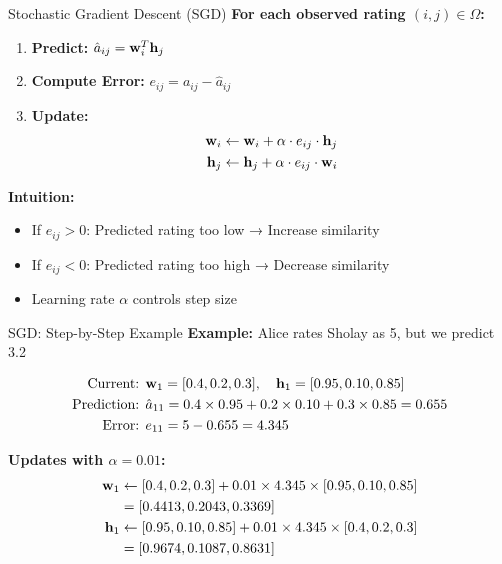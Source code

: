 \documentclass{beamer}
\begin{document}
\begin{frame}{Stochastic Gradient Descent (SGD)}
\textbf{For each observed rating $(i,j) \in \Omega$:}

\pause
\begin{enumerate}[<+->]
    \item \textbf{Predict:} $\hat{a}_{ij} = \mathbf{w}_i^T \mathbf{h}_j$
    \item \textbf{Compute Error:} $e_{ij} = a_{ij} - \hat{a}_{ij}$  
    \item \textbf{Update:}
    \begin{align}
    \mathbf{w}_i &\leftarrow \mathbf{w}_i + \alpha \cdot e_{ij} \cdot \mathbf{h}_j \\
    \mathbf{h}_j &\leftarrow \mathbf{h}_j + \alpha \cdot e_{ij} \cdot \mathbf{w}_i
    \end{align}
\end{enumerate}

\pause
\textbf{Intuition:}
\begin{itemize}[<+->]
    \item If $e_{ij} > 0$: Predicted rating too low → Increase similarity
    \item If $e_{ij} < 0$: Predicted rating too high → Decrease similarity
    \item Learning rate $\alpha$ controls step size
\end{itemize}
\end{frame}

\begin{frame}{SGD: Step-by-Step Example}
\textbf{Example:} Alice rates Sholay as 5, but we predict 3.2

\pause
\begin{align}
\text{Current: } &\mathbf{w}_1 = [0.4, 0.2, 0.3], \quad \mathbf{h}_1 = [0.95, 0.10, 0.85] \\
\text{Prediction: } &\hat{a}_{11} = 0.4 \times 0.95 + 0.2 \times 0.10 + 0.3 \times 0.85 = 0.655 \\
\text{Error: } &e_{11} = 5 - 0.655 = 4.345
\end{align}

\pause
\textbf{Updates with $\alpha = 0.01$:}
\begin{align}
\mathbf{w}_1 &\leftarrow [0.4, 0.2, 0.3] + 0.01 \times 4.345 \times [0.95, 0.10, 0.85] \\
&= [0.4413, 0.2043, 0.3369] \\
\mathbf{h}_1 &\leftarrow [0.95, 0.10, 0.85] + 0.01 \times 4.345 \times [0.4, 0.2, 0.3] \\
&= [0.9674, 0.1087, 0.8631]
\end{align}
\end{frame}
\end{document}
